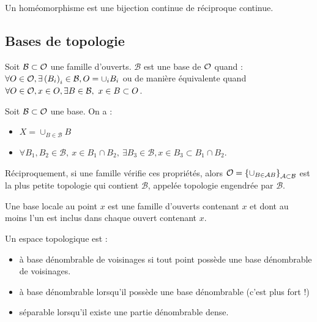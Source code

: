 \documentclass{cours}
\begin{document}
\begin{definition}
    Un homéomorphisme est une bijection continue de réciproque continue.
\end{definition}

\subsection{Bases de topologie}
\begin{definition}
    Soit $\mathcal{B} \subset \mathcal{O}$ une famille d'ouverts. $\mathcal{B}$ est une base de $\mathcal{O}$ quand : $\forall O \in \mathcal{O}, \exists \left(B_{i}\right)_{i}\in \mathcal{B}, O = \cup_{i} B_{i}$ ou de manière équivalente quand $\forall O \in \mathcal{O}, x \in O, \exists B \in \mathcal{B},\ x \in B \subset O$. 
\end{definition}

\begin{theorem}
    Soit $\mathcal{B} \subset \mathcal{O}$ une base. On a : 
    \begin{itemize}
        \item $X = \cup_{B \in \mathcal{B}} B$
        \item $\forall B_{1}, B_{2} \in \mathcal{B},\ x \in B_{1} \cap B_{2},\ \exists B_{3} \in \mathcal{B}, x \in B_{3} \subset B_{1} \cap B_{2}$.
    \end{itemize}
    Réciproquement, si une famille vérifie ces propriétés, alors $\mathcal{O} = \left\{\cup_{B \in \mathcal{A} B}\right\}_{\mathcal{A} \subset \mathcal{B}}$ est la plus petite topologie qui contient $\mathcal{B}$, appelée topologie engendrée par $\mathcal{B}$.
\end{theorem}

\begin{definition}
    Une base locale au point $x$ est une famille d'ouverts contenant $x$ et dont au moins l'un est inclus dans chaque ouvert contenant $x$.
\end{definition}

\begin{definition}
    Un espace topologique est :
    \begin{itemize}
        \item à base dénombrable de voisinages si tout point possède une base dénombrable de voisinages.
        \item à base dénombrable lorsqu'il possède une base dénombrable (c’est plus fort !)
        \item séparable lorsqu'il existe une partie dénombrable dense.
    \end{itemize}
\end{definition}
\end{document}

